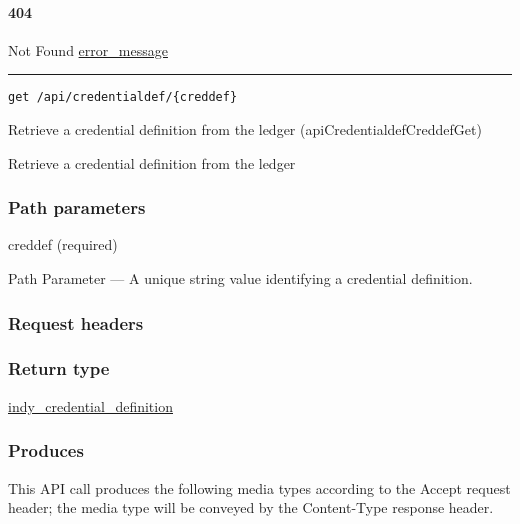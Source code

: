 \hypertarget{section-107}{%
\paragraph{404}\label{section-107}}

Not Found \protect\hyperlink{error_message}{error\_message}

\begin{center}\rule{0.5\linewidth}{\linethickness}\end{center}

\protect\hypertarget{apiCredentialdefCreddefGet}{}{}

\begin{verbatim}
get /api/credentialdef/{creddef}
\end{verbatim}

Retrieve a credential definition from the ledger
({apiCredentialdefCreddefGet})

Retrieve a credential definition from the ledger

\hypertarget{path-parameters-18}{%
\subsubsection{Path parameters}\label{path-parameters-18}}

creddef (required)

{Path Parameter} --- A unique string value identifying a credential
definition.

\hypertarget{request-headers-14}{%
\subsubsection{Request headers}\label{request-headers-14}}

\hypertarget{return-type-25}{%
\subsubsection{Return type}\label{return-type-25}}

\protect\hyperlink{indy_credential_definition}{indy\_credential\_definition}

\hypertarget{produces-32}{%
\subsubsection{Produces}\label{produces-32}}

This API call produces the following media types according to the
{Accept} request header; the media type will be conveyed by the
{Content-Type} response header.

